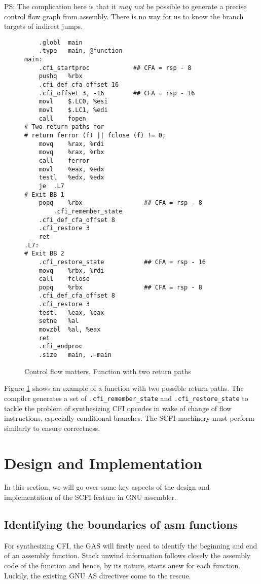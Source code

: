 \documentclass{article} \usepackage[a4paper, total={6in, 8in}]{geometry}
\begin{document}
PS: The complication here is that it \emph{may not} be possible to generate a
precise control flow graph from assembly.  There is no way for us to know the
branch targets of indirect jumps.

\begin{figure}
\caption{Control flow matters. Function with two return paths}
\label{funcwithtworets}
\begin{verbatim}
	.globl	main
	.type	main, @function
main:
	.cfi_startproc            ## CFA = rsp - 8
	pushq	%rbx
	.cfi_def_cfa_offset 16
	.cfi_offset 3, -16        ## CFA = rsp - 16
	movl	$.LC0, %esi
	movl	$.LC1, %edi
	call	fopen
# Two return paths for
# return ferror (f) || fclose (f) != 0;
	movq	%rax, %rdi
	movq	%rax, %rbx
	call	ferror
	movl	%eax, %edx
	testl	%edx, %edx
	je	.L7
# Exit BB 1
	popq	%rbx                 ## CFA = rsp - 8
        .cfi_remember_state
	.cfi_def_cfa_offset 8
	.cfi_restore 3
	ret
.L7:
# Exit BB 2
	.cfi_restore_state           ## CFA = rsp - 16
	movq	%rbx, %rdi
	call	fclose
	popq	%rbx                 ## CFA = rsp - 8
	.cfi_def_cfa_offset 8
	.cfi_restore 3
	testl	%eax, %eax
	setne	%al
	movzbl	%al, %eax
	ret
	.cfi_endproc
	.size	main, .-main
\end{verbatim}
\end{figure}

Figure \ref{funcwithtworets} shows an example of a function with two possible
return paths.  The compiler generates a set of \texttt{.cfi\_remember\_state}
and \texttt{.cfi\_restore\_state} to tackle the problem of synthesizing CFI
opcodes in wake of change of flow instructions, especially conditional
branches.  The SCFI machinery must perform similarly to
ensure correctness.

\section{Design and Implementation}
In this section, we will go over some key aspects of the design and
implementation of the SCFI feature in GNU assembler.

\subsection{Identifying the boundaries of asm functions}
For synthesizing CFI, the GAS will firstly need to identify the beginning
and end of an assembly function.  Stack unwind information follows closely the
assembly code of the function and hence, by its nature, starts anew for each
function.  Luckily, the existing GNU AS directives come to the rescue.
\end{document}
